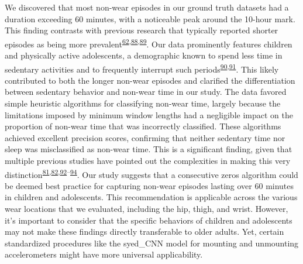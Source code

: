 \documentclass[
  9pt,
]{scrbook}
\begin{document}
We discovered that most non-wear episodes in our ground truth datasets
had a duration exceeding 60 minutes, with a noticeable peak around the
10-hour mark. This finding contrasts with previous research that
typically reported shorter episodes as being more
prevalent\textsuperscript{\protect\hyperlink{ref-jaeschke_variability_2018}{62},\protect\hyperlink{ref-aadland_comparison_2018}{88},\protect\hyperlink{ref-hutto_identifying_2013}{89}}.
Our data prominently features children and physically active
adolescents, a demographic known to spend less time in sedentary
activities and to frequently interrupt such
periods\textsuperscript{\protect\hyperlink{ref-cooper_objectively_2015}{90},\protect\hyperlink{ref-kwon_breaks_2012}{91}}.
This likely contributed to both the longer non-wear episodes and
clarified the differentiation between sedentary behavior and non-wear
time in our study. The data favored simple heuristic algorithms for
classifying non-wear time, largely because the limitations imposed by
minimum window lengths had a negligible impact on the proportion of
non-wear time that was incorrectly classified. These algorithms achieved
excellent precision scores, confirming that neither sedentary time nor
sleep was misclassified as non-wear time. This is a significant finding,
given that multiple previous studies have pointed out the complexities
in making this very
distinction\textsuperscript{\protect\hyperlink{ref-troiano_physical_2008}{81},\protect\hyperlink{ref-choi_validation_2011}{82},\protect\hyperlink{ref-duncan_wear-time_2018}{92}--\protect\hyperlink{ref-barouni_ambulatory_2020}{94}}.
Our study suggests that a consecutive zeros algorithm could be deemed
best practice for capturing non-wear episodes lasting over 60 minutes in
children and adolescents. This recommendation is applicable across the
various wear locations that we evaluated, including the hip, thigh, and
wrist. However, it's important to consider that the specific behaviors
of children and adolescents may not make these findings directly
transferable to older adults. Yet, certain standardized procedures like
the syed\_CNN model for mounting and unmounting accelerometers might
have more universal applicability.
\end{document}
